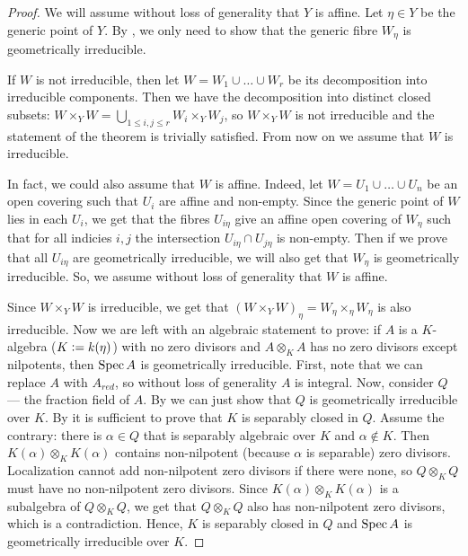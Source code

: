 \begin{proof}
We will assume without loss of generality that $Y$ is affine. Let $\eta \in Y$ be the generic point of $Y$. By \cite[IV.3, 9.7.8]{EGA}, we only need to show that the generic fibre $W_\eta$ is geometrically irreducible.

If $W$ is not irreducible, then let $W = W_1 \cup \dots \cup W_r$ be its decomposition into irreducible components. Then we have the decomposition into distinct closed subsets: $W \times_Y W = \bigcup_{1 \le i, j \le r} W_i \times_Y W_j$, so $W \times_Y W$ is not irreducible and the statement of the theorem is trivially satisfied. From now on we assume that $W$ is irreducible.

In fact, we could also assume that $W$ is affine. Indeed, let $W = U_1 \cup \dots \cup U_n$ be an open covering such that $U_i$ are affine and non-empty. Since the generic point of $W$ lies in each $U_i$, we get that the fibres $U_{i\eta}$ give an affine open covering of $W_\eta$ such that for all indicies $i, j$ the intersection $U_{i\eta} \cap U_{j\eta}$ is non-empty. Then if we prove that all $U_{i\eta}$ are geometrically irreducible, we will also get that $W_\eta$ is geometrically irreducible. So, we assume without loss of generality that $W$ is affine.

Since $W \times_Y W$ is irreducible, we get that $(W \times_Y W)_\eta = W_\eta \times_\eta W_\eta$ is also irreducible. Now we are left with an algebraic statement to prove: if $A$ is a $K$-algebra ($K \vcentcolon= k(\eta)$) with no zero divisors and $A \otimes_K A$ has no zero divisors except nilpotents, then $\operatorname{Spec} A$ is geometrically irreducible. First, note that we can replace $A$ with $A_{red}$, so without loss of generality $A$ is integral. Now, consider $Q$ --- the fraction field of $A$. By  we can just show that $Q$ is geometrically irreducible over $K$. By  it is sufficient to prove that $K$ is separably closed in $Q$. Assume the contrary: there is $\alpha \in Q$ that is separably algebraic over $K$ and $\alpha \not \in K$. Then $K(\alpha) \otimes_K K(\alpha)$ contains non-nilpotent (because $\alpha$ is separable) zero divisors. Localization cannot add non-nilpotent zero divisors if there were none, so $Q \otimes_K Q$ must have no non-nilpotent zero divisors. Since $K(\alpha) \otimes_K K(\alpha)$ is a subalgebra of $Q \otimes_K Q$, we get that $Q \otimes_K Q$ also has non-nilpotent zero divisors, which is a contradiction. Hence, $K$ is separably closed in $Q$ and $\operatorname{Spec} A$ is geometrically irreducible over $K$.
\end{proof}

